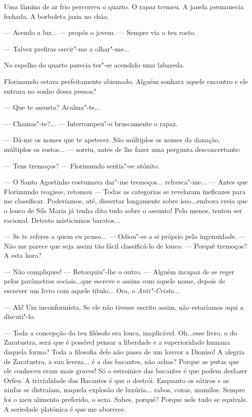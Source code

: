 Uma lâmina de ar frio percorreu o quarto. O rapaz tremeu. A janela
permanecia fechada. A borboleta jazia no chão.

--- Acendo a luz... --- propôs o jovem. --- Sempre via o teu rosto.

--- Talvez prefiras ouvir"-me a olhar"-me...

No espelho do quarto parecia ter"-se acendido uma labareda.

Florimundo estava perfeitamente abismado. Alguém sonhara aquele encontro
e ele entrara no sonho dessa pessoa?

--- Que te assusta? Acalma"-te...

--- Chamas"-te?... --- Interrompeu"-o bruscamente o rapaz.

--- Dá-me os nomes que te apetecer. São múltiplos os nomes da danação,
múltiplos os rostos... --- sorriu, antes de lhe fazer uma pergunta
desconcertante:

--- Tens tremoços? --- Florimundo sentia"-se atónito.

--- O Santo Agostinho costumava dar"-me tremoços... refresca"-me... ---  Antes
que Florimundo reagisse, retomou --- Todas as categorias se revelaram
ineficazes para me classificar. Poderíamos, até, dissertar longamente
sobre isso...embora creia que o louco de Sils Maria já tenha dito tudo
sobre o assunto! Pelo menos, tentou ser racional. Detesto misticismos
baratos...

--- Se te referes a quem eu penso... --- Odiou"-se a si próprio pela
ingenuidade. --- Não me parece que seja assim tão fácil classificá-lo de
louco. ---  Porquê tremoços? A esta hora?

--- Não compliques! --- Retorquiu"-lhe o outro. --- Alguém incapaz de se reger
pelos parâmetros sociais...que escreve e assina com aquele nome, depois
de escrever um livro com aquele título... Ora, o \emph{Anti"-Cristo...}

--- Ah! Um inconformista. Se ele não tivesse escrito assim, não estaríamos
aqui a discuti"-lo.

--- Toda a concepção do teu filósofo era louca, inaplicável. Oh...esse
livro, o do Zaratustra, será que é possível pensar a liberdade e a
superioridade humana daquela forma? Toda a filosofia dele não passa de
um louvor a Dioniso! A alegria de Zaratustra, a sua leveza... é a das
bacantes, não achas? Porque as putas que ele conheceu eram mais graves!
Só a estroinice das bacantes é que podem desfazer Orfeu. A trivialidade
das Bacantes é que o destrói. Enquanto os sátiros e as ninfas se
distraíam, naquela explosão de luxúria... rabos, coxas, mamilos. Sempre
foi o meu alimento preferido, o sexo. Sabes, porquê? Porque nele tudo se
equivale. A seriedade platónica é que me aborrece.

